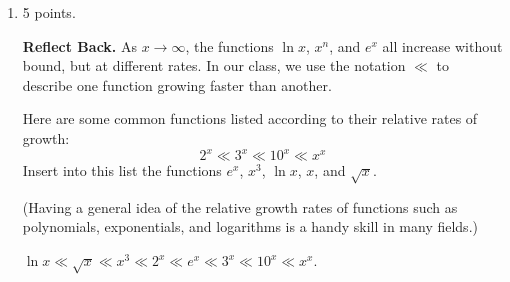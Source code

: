\documentclass{article}
\begin{document}
\begin{enumerate}

\item 

\begin{grading}
5 points.
\end{grading}

  \begin{problem}
    \textbf{Reflect Back.} As $x\to\infty$, the functions
    $\ln x$, $x^n$, and $e^x$ all increase without bound, but at different rates.  In our class, we use the notation $\ll$ to describe one function growing faster than another.

    Here are some common functions listed according to their relative
    rates of growth:
    \[ 2^x \ll 3^x \ll 10^x \ll x^x \] Insert into this list the functions
    $e^x$, $x^3$, $\ln x$, $x$, and $\sqrt{x}$.

    (Having a general idea of the relative growth rates of functions such
    as polynomials, exponentials, and logarithms is a handy skill in many
    fields.)    
  \end{problem}


  \begin{solution}
    $\ln x \ll \sqrt{x} \ll x^3 \ll 2^x \ll e^x \ll 3^x \ll 10^x \ll
    x^x$. 
  \end{solution}




\end{enumerate}

\psreflection{}

  
\end{document}
